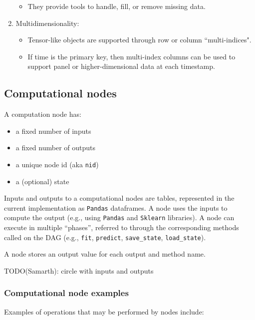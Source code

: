 \documentclass[11pt, reqno]{amsart}
\theoremstyle{definition}
\theoremstyle{remark}
\begin{document}
\begin{enumerate}
\begin{itemize}
        \item They provide tools to handle, fill, or remove missing data.
      \end{itemize}

    \item Multidimensionality:
      \begin{itemize}
        \item Tensor-like objects are supported through row or column ``multi-indices".

        \item If time is the primary key, then multi-index columns can be used
          to support panel or higher-dimensional data at each timestamp.
      \end{itemize}
  \end{enumerate}


  \subsection{Computational nodes}

A computation node has:
\begin{itemize}
  \item a fixed number of inputs
  \item a fixed number of outputs
  \item a unique node id (aka \verb|nid|)
  \item a (optional) state
\end{itemize}

Inputs and outputs to a computational nodes are tables, represented in the
current implementation as \verb|Pandas| dataframes.
A node uses the inputs to compute the output (e.g., using \verb|Pandas| and
\verb|Sklearn| libraries).
A node can execute in multiple ``phases'', referred to through the
corresponding methods called on the DAG (e.g., \verb|fit|, \verb|predict|,
\verb|save_state|, \verb|load_state|).

A node stores an output value for each output and method name.

TODO(Samarth): circle with inputs and outputs

\subsubsection{Computational node examples}
Examples of operations that may be performed by nodes include:
\end{document}
